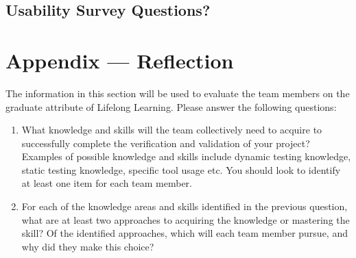 \documentclass[12pt, titlepage]{article}
\begin{document}
\subsection{Usability Survey Questions?}


\newpage{}
\section*{Appendix --- Reflection}

The information in this section will be used to evaluate the team members on the graduate attribute
of Lifelong Learning. Please answer the following questions:

\begin{enumerate}
	\item What knowledge and skills will the team collectively need to acquire to successfully complete the
	      verification and validation of your project? Examples of possible knowledge and skills include
	      dynamic testing knowledge, static testing knowledge, specific tool usage etc. You should look to
	      identify at least one item for each team member.
	\item For each of the knowledge areas and skills identified in the previous question, what are at least
	      two approaches to acquiring the knowledge or mastering the skill? Of the identified approaches,
	      which will each team member pursue, and why did they make this choice?
\end{enumerate}
\end{document}
